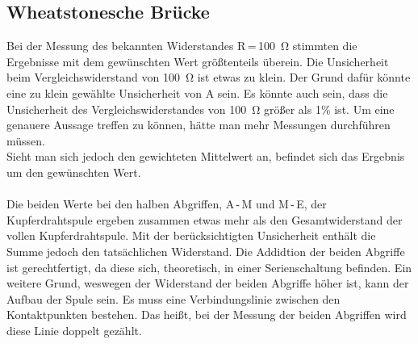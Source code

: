 \documentclass[a4paper,usenatbib]{aspdoc}
\begin{document}
        \subsection{Wheatstonesche Brücke}\label{subsec:discussion_wheatstone}
            Bei der Messung des bekannten Widerstandes R\,=\,\SI{100}{\ohm} stimmten die Ergebnisse mit dem gewünschten Wert größtenteils überein. Die Unsicherheit beim Vergleichswiderstand von \SI{100}{\ohm} ist etwas zu klein. Der Grund dafür könnte eine zu klein gewählte Unsicherheit von A sein. Es könnte auch sein, dass die Unsicherheit des Vergleichswiderstandes von \SI{100}{\ohm} größer als 1\% ist. Um eine genauere Aussage treffen zu können, hätte man mehr Messungen durchführen müssen. \\
            Sieht man sich jedoch den gewichteten Mittelwert an, befindet sich das Ergebnis um den gewünschten Wert.\\
            \\
            Die beiden Werte bei den halben Abgriffen, A\,-\,M und M\,-\,E,  der Kupferdrahtspule ergeben zusammen etwas mehr als den Gesamtwiderstand der vollen Kupferdrahtspule. Mit der berücksichtigten Unsicherheit enthält die Summe jedoch den tatsächlichen Widerstand. Die Addidtion der beiden Abgriffe ist gerechtfertigt, da diese sich, theoretisch, in einer Serienschaltung befinden. Ein weitere Grund, weswegen der Widerstand der beiden Abgriffe höher ist, kann der Aufbau der Spule sein. Es muss eine Verbindungslinie zwischen den Kontaktpunkten bestehen. Das heißt, bei der Messung der beiden Abgriffen wird diese Linie doppelt gezählt.\\
            
            
\end{document}
